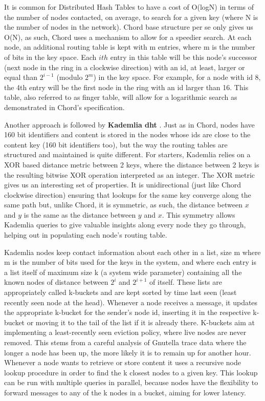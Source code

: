 It is common for Distributed Hash Tables to have a cost of O(log{}N) in terms
of the number of nodes contacted, on average, to search for a given key (where
N is the number of nodes in the network). Chord base structure per se only
gives us O(N), as such, Chord uses a mechanism to allow for a speedier search.
At each node, an additional routing table is kept with m entries, where m is
the number of bits in the key space. Each $ith$ entry in this table will be
this node's successor (next node in the ring in a clockwise direction) with an
\acrshort{id}, at least, larger or equal than $2^{i-1}$ (modulo $2^{m}$) in the
key space.  For example, for a node with \acrshort{id} 8, the 4th entry will be
the first node in the ring with an \acrshort{id} larger than 16. This table,
also referred to as finger table, will allow for a logarithmic search as
demonstrated in Chord's specification.

Another approach is followed by \textbf{Kademlia \acrshort{dht}} \cite{Maymounkov2002}.
Just as in Chord, nodes have 160 bit identifiers and content is
stored in the nodes whose \acrshort{id}s are close to the content key (160 bit
identifiers too), but the way the routing tables are structured and
maintained is quite different. For starters, Kademlia relies on a XOR
based distance metric between 2 keys, where the distance between 2 keys
is the resulting bitwise XOR operation interpreted as an integer. The
XOR metric gives us an interesting set of properties. It is
unidirectional (just like Chord clockwise direction) ensuring that
lookups for the same key converge along the same path but, unlike Chord,
it is symmetric, as such, the distance between $x$ and $y$ is the same as
the distance between $y$ and $x$. This symmetry allows Kademlia queries to
give valuable insights along every node they go through, helping out in
populating each node's routing table.

Kademlia nodes keep contact information about each other in a list, size m
where m is the number of bits used for the keys in the system, and where each
entry is a list itself of maximum size k (a system wide parameter) containing
all the known nodes of distance between $2^{i}$ and $2^{i+1}$ of itself. These
lists are appropriately called k-buckets and are kept sorted by time last seen
(least recently seen node at the head). Whenever a node receives a message, it
updates the appropriate k-bucket for the sender's node \acrshort{id}, inserting
it in the respective k-bucket or moving it to the tail of the list if it is
already there. K-buckets aim at implementing a least-recently seen eviction
policy, where live nodes are never removed.  This stems from a careful analysis
of Gnutella trace data \cite{Saroiu2002} where the longer a node has been up,
the more likely it is to remain up for another hour. Whenever a node wants to
retrieve or store content it uses a recursive node lookup procedure in order to
find the k closest nodes to a given key. This lookup can be run with multiple
queries in parallel, because nodes have the flexibility to forward messages to
any of the k nodes in a bucket, aiming for lower latency.

